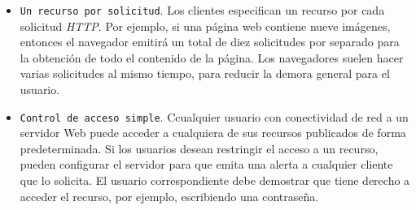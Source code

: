 \begin{description}
\begin{itemize}
		\item 	\texttt{Un recurso por solicitud}. Los clientes especifican un recurso por cada  solicitud \textit{HTTP}. Por ejemplo, si una p\'agina web  contiene nueve imágenes,  entonces el navegador emitirá un total de diez solicitudes por separado para la obtención de todo el contenido de la página. Los navegadores suelen hacer varias solicitudes al mismo tiempo, para reducir la demora general para el usuario.
		
		\item \texttt{Control de acceso simple}.  Ccualquier usuario con conectividad de red a un servidor Web puede acceder a cualquiera de sus recursos publicados de forma predeterminada. Si los usuarios desean restringir el acceso a un recurso,  pueden configurar el servidor para que emita una alerta  a cualquier cliente que lo solicita. El usuario correspondiente debe demostrar que tiene derecho a acceder el recurso, por ejemplo, escribiendo una contraseña.
		
	\end{itemize}
	
	
	
	

\end{description}
